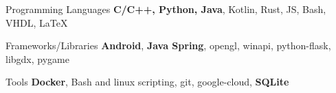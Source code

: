 

\begin{cvskills}

  \cvskill
    {Programming Languages} %
    {\textbf{C/C++, Python, Java}, Kotlin, Rust, JS, Bash, VHDL, \LaTeX} %

  \cvskill
    {Frameworks/Libraries} %
    {\textbf{Android}, \textbf{Java Spring}, opengl, winapi, python-flask, libgdx, pygame} %

  \cvskill
    {Tools} %
    {\textbf{Docker}, Bash and linux scripting, git, google-cloud, \textbf{SQLite}} %

\end{cvskills}

